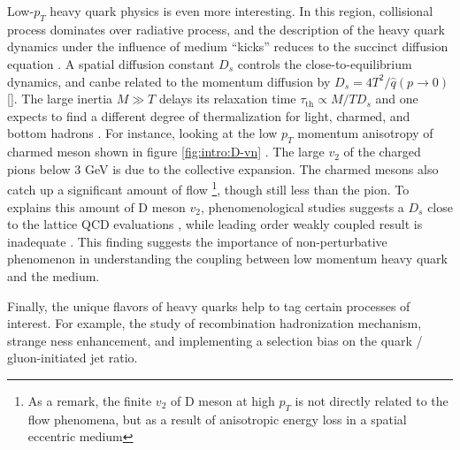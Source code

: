 Low-$p_T$ heavy quark physics is even more interesting.
In this region, collisional process dominates over radiative process, and the description of the heavy quark dynamics under the influence of medium ``kicks'' reduces to the succinct diffusion equation \cite{Moore:2004tg}.
A spatial diffusion constant $D_s$ controls the close-to-equilibrium dynamics, and canbe related to the momentum diffusion by $D_s = 4T^2/\hat{q}(p\rightarrow 0)$ [].
The large inertia $M\gg T$ delays its relaxation time $\tau_{\textrm{th}} \propto M/T D_s$ and one expects to find a different degree of thermalization for light, charmed, and bottom hadrons \cite{PhysRevD.37.2484,Moore:2004tg,Riek:2010fk,Cao:2013ita}.
For instance, looking at the low $p_T$ momentum anisotropy of charmed meson shown in figure \ref{fig:intro:D-vn} \cite{Acharya:2017qps,Sirunyan:2017plt}.
The large $v_2$ of the charged pions below $3$ GeV is due to the collective expansion.
The charmed mesons also catch up a significant amount of flow \footnote{As a remark, the finite $v_2$ of D meson at high $p_T$ is not directly related to the flow phenomena, but as a result of anisotropic energy loss in a spatial eccentric medium}, though still less than the pion.
To explains this amount of D meson $v_2$, phenomenological studies suggests a $D_s$ close to the lattice QCD evaluations \cite{He:2012df,Cao:2013ita,Xu:2017obm,Banerjee:2011ra,Ding:2012sp,Francis:2015daa}, while leading order weakly coupled result \cite{Moore:2004tg} is inadequate . 
This finding suggests the importance of non-perturbative phenomenon in understanding the coupling between low momentum heavy quark and the medium.

Finally, the unique flavors of heavy quarks help to tag certain processes of interest. 
For example, the study of recombination hadronization mechanism, strange ness enhancement, and implementing a selection bias on the quark / gluon-initiated jet ratio.

